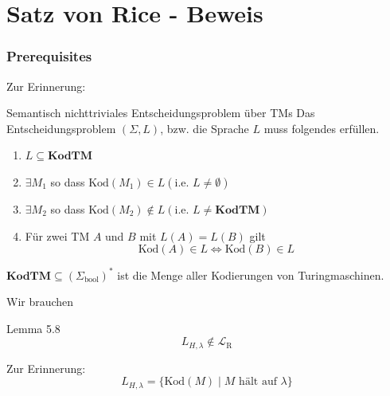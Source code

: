 \documentclass[a4paper, 11pt]{article}
\def\Lr{\mathcal{L}_\text{R}}
\begin{document}
                    \section{Satz von Rice - Beweis}

                    
                        \subsubsection{Prerequisites}
                        Zur Erinnerung:
                        \begin{mainbox}{Semantisch nichttriviales Entscheidungsproblem über TMs}
                            Das Entscheidungsproblem $(\Sigma, L)$, bzw. die Sprache $L$ muss folgendes erfüllen.
                            \begin{enumerate}[label=\Roman*.]
                                
                                \item $L \subseteq \textbf{KodTM}$
                                
                                \item $\exists M_1$ so dass $\text{Kod}(M_1) \in L (\text{i.e. } L \neq \emptyset)$
                                \item $\exists M_2$ so dass $\text{Kod}(M_2) \notin L (\text{i.e. } L \neq \textbf{KodTM})$
                                
                                \item Für zwei TM $A$ und $B$ mit $L(A) = L(B)$ gilt
                                $$\text{Kod}(A) \in L \iff \text{Kod}(B) \in L$$
                            \end{enumerate}
                        \end{mainbox}
                        $\textbf{KodTM}\subseteq (\Sigma_{\text{bool}})^*$ ist die Menge aller Kodierungen von Turingmaschinen.
                    
                    
                        Wir brauchen 
                        \begin{mainbox}{Lemma 5.8}
                            $$L_{H, \lambda} \notin \Lr$$
                        \end{mainbox}
                        Zur Erinnerung: 
                        $$L_{H, \lambda} = \{\text{Kod}(M) \mid M \text{ hält auf }\lambda\}$$
                    
                    
                    
\end{document}
